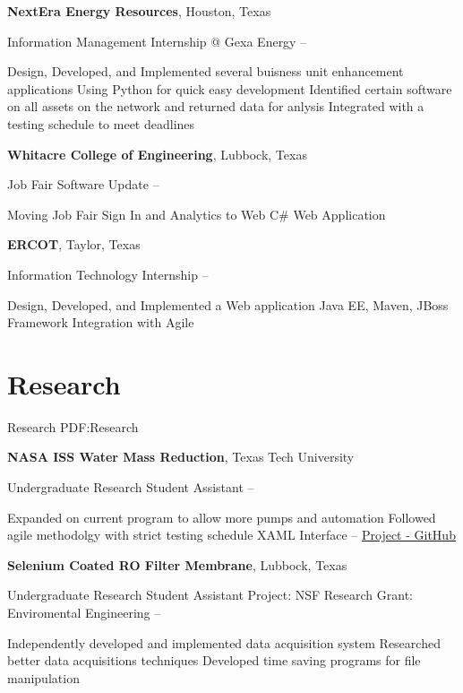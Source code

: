 \documentclass[a4paper,10pt,oneside]{article}
\begin{document}
\begin{body}
{\textbf{NextEra Energy Resources}},
Houston, Texas
\par
\Item
Information Management Internship @ Gexa Energy
\hfill
{} --
\begin{detail}
\BulletItem
Design, Developed, and Implemented several buisness unit enhancement applications
\BulletItem
Using Python for quick easy development
\BulletItem
Identified certain software on all assets on the network and returned data for anlysis
\BulletItem
Integrated with a testing schedule to meet deadlines
\end{detail}
\SmallEntryGap
\SmallEntryGap

{\textbf{Whitacre College of Engineering}},
Lubbock, Texas
\par
\Item
Job Fair Software Update
\hfill
{} --
\begin{detail}
\BulletItem
Moving Job Fair Sign In and Analytics to Web
\BulletItem
C\# Web Application
\end{detail}
\SmallEntryGap
\SmallEntryGap

{\textbf{ERCOT}},
Taylor, Texas
\par
\Item
Information Technology Internship
\hfill
{} --
\begin{detail}
\BulletItem
Design, Developed, and Implemented a Web application
\BulletItem
Java EE, Maven, JBoss Framework
\BulletItem
Integration with Agile
\end{detail}
\SmallEntryGap
\SmallEntryGap


\section{Research}
{Research}
{PDF:Research}

{\textbf{NASA ISS Water Mass Reduction}},
Texas Tech University
\par
\Item
Undergraduate Research Student Assistant
\hfill
{} --
\begin{detail}

\BulletItem
Expanded on current program to allow more pumps and automation
\BulletItem
Followed agile methodolgy with strict testing schedule
\BulletItem
XAML Interface --  \href{https://github.com/rahutchinson/Pump_Control}{\underline{Project - GitHub}}
\end{detail}
\SmallEntryGap
{\textbf{Selenium Coated RO Filter Membrane}},
Lubbock, Texas
\par
\Item
Undergraduate Research Student Assistant
\Item
Project:
NSF Research Grant: Enviromental Engineering
\hfill
{} --
\begin{detail}
\BulletItem
Independently developed and implemented data acquisition system
\BulletItem
Researched better data acquisitions techniques
\BulletItem
Developed time saving programs for file manipulation
\end{detail}


\end{body}
\end{document}
